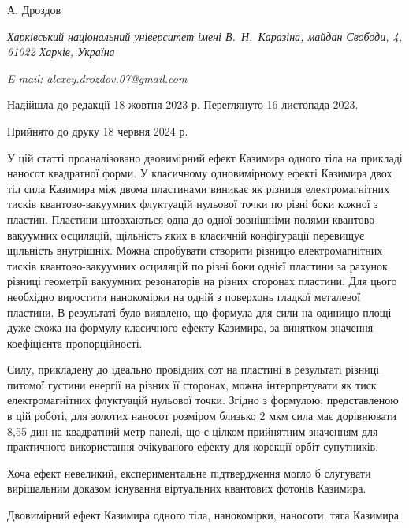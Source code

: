 \documentclass[twoside, 10pt]{article}
\makeatletter
\def\mynameukr{А. Дроздов}
\def\myemail{alexey.drozdov.07@gmail.com}
\def\myworkplaceukr{Харківський національний університет імені В.~Н.~Каразіна, майдан Свободи, 4, 61022 Харків, Україна}
\def\myorcidlink{0009-0004-1386-4534}
\def\myreceivedukr{Надійшла до редакції 18 жовтня 2023 р. Переглянуто 16 листопада 2023.}
\def\myacceptedukr{Прийнято до друку 18 червня 2024 р.}
\makeatother
\begin{document}
\centerline{\Large{\mynameukr \,\orcidlink{\myorcidlink} }}
\vspace{3mm}
\centerline{\textit{\myworkplaceukr}}
\centerline{\textit{E-mail: \href{mailto:\myemail}{\myemail}}}

\vspace{3mm}
\centerline{\myreceivedukr}
\centerline{\myacceptedukr}

\vspace{3.5mm}

У цій статті проаналізовано двовимірний ефект Казимира одного тіла
на прикладі наносот квадратної форми.
У класичному одновимірному  ефекті Казимира двох тіл сила Казимира між двома пластинами виникає як різниця електромагнітних тисків
 квантово-вакуумних флуктуацій нульової точки по різні боки кожної з пластин.
Пластини штовхаються одна до одної зовнішніми полями квантово-вакуумних осциляцій, щільність
яких в класичній конфігурації перевищує щільність внутрішніх.
Можна спробувати створити різницю електромагнітних тисків
квантово-вакуумних осциляцій по різні боки однієї пластини
за рахунок різниці геометрії вакуумних резонаторів на різних сторонах пластини.
Для цього необхідно виростити нанокомірки на одній з поверхонь гладкої металевої пластини.
В результаті було виявлено, що формула для сили на одиницю площі дуже схожа на формулу класичного ефекту Казимира,
за винятком значення коефіцієнта пропорційності.

Силу, прикладену до ідеально провідних сот на пластині в результаті
різниці питомої густини енергії на різних її сторонах, можна інтерпретувати
як тиск електромагнітних флуктуацій нульової точки.
Згідно з формулою, представленою в цій роботі, для золотих наносот
розміром близько 2 мкм сила має дорівнювати 8,55 дин на квадратний метр панелі, що є цілком
прийнятним значенням для практичного використання очікуваного ефекту для корекції орбіт супутників.

    Хоча ефект невеликий, експериментальне підтвердження
могло б слугувати вирішальним доказом існування віртуальних квантових фотонів Казимира.

\begin{keywords}
Двовимірний ефект Казимира одного тіла, нанокомірки, наносоти, тяга Казимира
\end{keywords}

    
\end{document}
